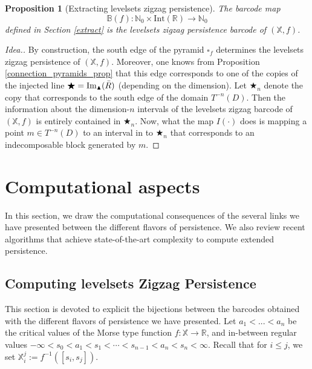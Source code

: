 \documentclass[11pt]{article}
\newtheorem{proposition}[theorem]{Proposition}
\theoremstyle{remark}
\newcommand{\N}{\mathbb{N}}
\newcommand{\R}{\mathbb{R}}
\newcommand{\X}{\mathbb{X}}
\begin{document}
\begin{proposition}[Extracting levelsets zigzag persistence]
The barcode map $$\mathbb{B}(f):\N_0\times\mathrm{Int}(\R)\rightarrow\N_0$$ defined in Section \ref{extract} is the levelsets zigzag persistence barcode of $(\X,f)$.
\end{proposition}

\begin{proof}[Idea.]
By construction, the south edge of the pyramid $\square_f$ determines the levelsets zigzag persistence of $(\X,f)$. Moreover, one knows from Proposition \ref{connection_pyramids_prop} that this edge corresponds to one of the copies of the injected line $\bigstar=\mathrm{Im}_\blacktriangle(\Bar{R})$ (depending on the dimension). Let $\bigstar_n$ denote the copy that corresponds to the south edge of the domain $T^{-n}(D)$. Then the information about the dimension-$n$ intervals of the levelsets zigzag barcode of $(\X,f)$ is entirely contained in $\bigstar_n$. Now, what the map $I(\cdot)$ does is mapping a point $m\in T^{-n}(D)$ to an interval in to $\bigstar_n$ that corresponds to an indecomposable block generated by $m$.
\end{proof}







\section{Computational aspects}
\label{algorithm}

In this section, we draw the computational consequences of the several links we have presented between the different flavors of persistence. We also review recent algorithms that achieve state-of-the-art complexity to compute extended persistence.




\subsection{Computing levelsets Zigzag Persistence}
\label{s:levelsetszigzag}

This section is devoted to explicit the bijections between the barcodes obtained with the different flavors of persistence we have presented. Let $a_1<...<a_n$ be the critical values of the Morse type function $f:\X\rightarrow\R$, and in-between regular values $-\infty<s_0<a_1<s_1<\cdots<s_{n-1}<a_n<s_n<\infty$. Recall that for $i \leq j$, we set $\mathbb{X}_i^j := f^{-1}([s_i,s_j])$.
\end{document}
